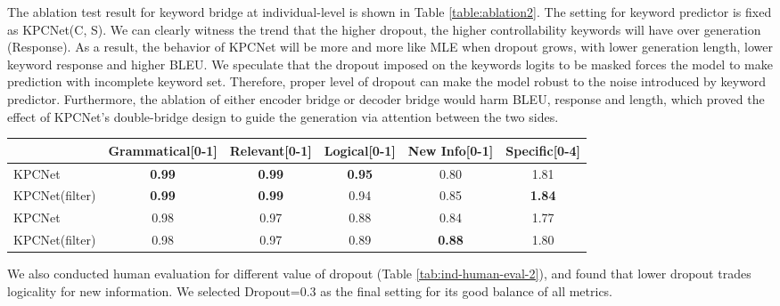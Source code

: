 \documentclass[11pt,a4paper]{article}
\begin{document}
  The ablation test result for keyword bridge at individual-level is shown in Table \ref{table:ablation2}. The setting for keyword predictor is fixed as KPCNet(C, S). We can clearly witness the trend that the higher dropout, the higher controllability keywords will have over generation (Response). As a result, the behavior of KPCNet will be more and more like MLE when dropout grows, with lower generation length, lower keyword response and higher BLEU. We speculate that the dropout imposed on the keywords logits to be masked forces the model to make prediction with incomplete keyword set. Therefore, proper level of dropout can make the model robust to the noise introduced by keyword predictor. Furthermore, the ablation of either encoder bridge or decoder bridge would harm BLEU, response and length, which proved the effect of KPCNet's double-bridge design to guide the generation via attention between the two sides. 
  

\begin{table*}[htbp]
\centering
\begin{tabular}{l|ccccc}
\hline
{} & Grammatical\tiny{[0-1]} & Relevant\tiny{[0-1]} & Logical\tiny{[0-1]} & New Info\tiny{[0-1]} & Specific\tiny{[0-4]} \\
\hline
KPCNet &        \textbf{0.99} &     \textbf{0.99} &    \textbf{0.95} &     0.80 &     1.81 \\
KPCNet(filter) &        \textbf{0.99} &     \textbf{0.99} &    0.94 &     0.85 &     \textbf{1.84} \\
\hline
KPCNet &        0.98 &     0.97 &    0.88 &     0.84 &     1.77 \\
KPCNet(filter) &        0.98 &     0.97 &    0.89 &     \textbf{0.88} &     1.80 \\
\hline
\end{tabular}
\caption{\label{tab:ind-human-eval-2} Comparison between KPCNet with Dropout=0.3 (upper half) and Dropout=0.2 (lower half) with individual-level human judgements on 100 sample products from \texttt{Home \& Kitchen}}
\end{table*}  

We also conducted human evaluation for different value of dropout (Table \ref{tab:ind-human-eval-2}), and found that lower dropout trades logicality for new information. We selected Dropout=0.3 as the final setting for its good balance of all metrics.



\end{document}
